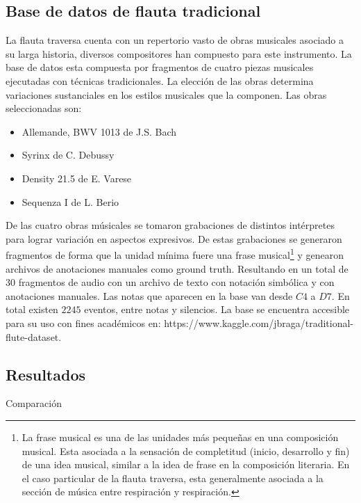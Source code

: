 \documentclass
  [ams,pdfout]%
	{aeslac}
\begin{document}
\subsection{Base de datos de flauta tradicional}

La flauta traversa cuenta con un repertorio vasto de obras musicales asociado a su larga historia,  diversos compositores han compuesto para este instrumento. La base de datos esta compuesta por fragmentos de cuatro piezas musicales ejecutadas con técnicas tradicionales. La elección de las obras determina variaciones sustanciales en los estilos musicales que la componen. Las obras seleccionadas son:
\begin{itemize}
\item Allemande, BWV 1013 de J.S. Bach
\item Syrinx de C. Debussy
\item Density 21.5 de E. Varese
\item Sequenza I de L. Berio
\end{itemize} 


De las cuatro obras músicales se tomaron grabaciones de distintos intérpretes para lograr variación en aspectos expresivos. De estas grabaciones se generaron fragmentos de forma que la unidad mínima fuere una frase musical\footnote{La frase musical es una de las unidades más pequeñas en una composición musical. Esta asociada a la sensación de completitud (inicio, desarrollo y fin) de una idea musical, similar a la idea de frase en la composición literaria. En el caso particular de la flauta traversa, esta generalmente asociada a la sección de música entre respiración y respiración\cite{blom1955grove}.} y genearon archivos de anotaciones manuales como ground truth. Resultando en un total de 30 fragmentos de audio con un archivo de texto con notación simbólica y con anotaciones manuales. Las notas que aparecen en la base van desde $C4$ a $D7$. En total existen $2245$ eventos, entre notas y silencios. La base se encuentra accesible para su uso con fines académicos en: https://www.kaggle.com/jbraga/traditional-flute-dataset.


\subsection{Resultados}
Comparación
\end{document}
